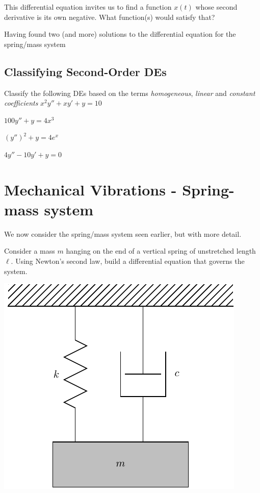 This differential equation invites us to find a function $x(t)$ whose
second derivative is its own negative.  What function(s) would satisfy
that?  \vfill

\newpage

Having found two (and more) solutions to the differential equation for
the spring/mass system

\newpage

\subsection*{Classifying Second-Order DEs}


 Classify the following DEs based on the terms {\em homogeneous}, {\em linear} and {\em constant coefficients}
 \vfill
 $x^2 y'' +  x y' + y = 10$
 \vfill

 $ 100 y'' +  y = 4x^3$
 \vfill

 $ (y'')^2 + y = 4 e^{x}$
 \vfill

 $ 4 y'' - 10 y' + y = 0 $
 \vfill

 \newpage


\section*{Mechanical Vibrations - Spring-mass system}

We now consider the spring/mass system seen earlier, but with more
detail.

Consider a mass $m$ hanging on the end of a vertical spring of
unstretched length $\ell$.  Using Newton's second law, build a
differential equation that governs the system.

\includegraphics[width=0.4\linewidth]{graphics/notes_08_hanging_mass}

\newpage

